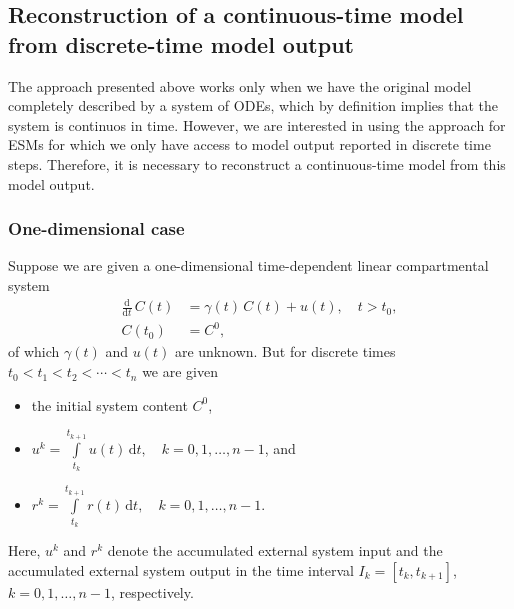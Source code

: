 \documentclass[11pt,a4paper]{article}
\newcommand{\deriv}[1]{\frac{\mathrm{d}}{\mathrm{d}#1}}
\newcommand{\dd}[1]{\,\mathrm{d}#1}
\newcommand{\intl}{\int\limits}
\begin{document}
\subsection{Reconstruction of a continuous-time model from discrete-time model output}
The approach presented above works only when we have the original model completely described by a system of ODEs, which by definition implies that the system is continuos in time. However, we are interested in using the approach for ESMs for which we only have access to model output reported in discrete time steps. Therefore, it is necessary to reconstruct a continuous-time model from this model output. 
    
    \subsubsection*{One-dimensional case}
        Suppose we are given a one-dimensional 
        time-dependent linear compartmental system
        \begin{equation}\label{eqn:CS_one_dim}
            \begin{aligned}
                \deriv{t}\,C(t) &= \gamma(t)\,C(t) + u(t),\quad t>t_0,\\
                C(t_0) &= C^0,
            \end{aligned}
        \end{equation}
        of which $\gamma(t)$ and $u(t)$ are unknown.
        But for discrete times $t_0<t_1<t_2<\cdots<t_n$ we are given
        \begin{itemize}
            \item the initial system content $C^0$,
            \item $u^k = \intl_{t_k}^{t_{k+1}} u(t)\dd{t},\quad k=0,1,\ldots,n-1$, and
            \item $r^k = \intl_{t_k}^{t_{k+1}} r(t)\dd{t},\quad k=0,1,\ldots,n-1$.
        \end{itemize}
        Here, $u^k$ and $r^k$ denote the accumulated external system input and the accumulated external system output in the time interval $I_k=[t_k,t_{k+1}]$, $k=0,1,\ldots,n-1$, respectively.
\end{document}
